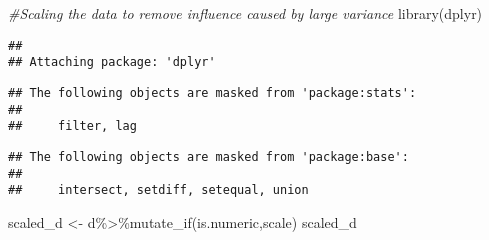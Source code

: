 \documentclass[
]{article}
\newenvironment{Shaded}{\begin{snugshade}}{\end{snugshade}}
\newcommand{\CommentTok}[1]{\textcolor[rgb]{0.56,0.35,0.01}{\textit{#1}}}
\newcommand{\FunctionTok}[1]{\textcolor[rgb]{0.00,0.00,0.00}{#1}}
\newcommand{\NormalTok}[1]{#1}
\newcommand{\OtherTok}[1]{\textcolor[rgb]{0.56,0.35,0.01}{#1}}
\newcommand{\SpecialCharTok}[1]{\textcolor[rgb]{0.00,0.00,0.00}{#1}}
\begin{document}
\begin{Shaded}
\begin{Highlighting}[]
\CommentTok{\#Scaling the data to remove influence caused by large variance}
\FunctionTok{library}\NormalTok{(dplyr)}
\end{Highlighting}
\end{Shaded}

\begin{verbatim}
## 
## Attaching package: 'dplyr'
\end{verbatim}

\begin{verbatim}
## The following objects are masked from 'package:stats':
## 
##     filter, lag
\end{verbatim}

\begin{verbatim}
## The following objects are masked from 'package:base':
## 
##     intersect, setdiff, setequal, union
\end{verbatim}

\begin{Shaded}
\begin{Highlighting}[]
\NormalTok{scaled\_d }\OtherTok{\textless{}{-}}\NormalTok{ d}\SpecialCharTok{\%\textgreater{}\%}\FunctionTok{mutate\_if}\NormalTok{(is.numeric,scale)}
\NormalTok{scaled\_d}
\end{Highlighting}
\end{Shaded}
\end{document}
